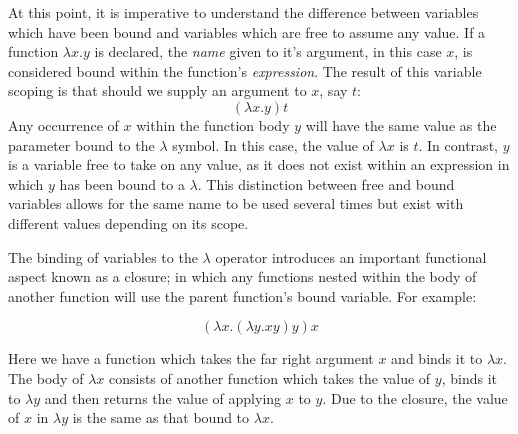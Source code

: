 \documentclass[12pt,a4paper]{article}
\begin{document}
At this point, it is imperative to understand the difference between variables which have been bound and variables which are free to assume any value. If a function $\lambda x.y$ is declared, the \emph{name} given to it's argument, in this case $x$, is considered bound within the function's \emph{expression}. The result of this variable scoping is that should we supply an argument to $x$, say $t$:
\begin{displaymath}
    (\lambda x.y)t
\end{displaymath}
Any occurrence of $x$ within the function body $y$ will have the same value as the parameter bound to the $\lambda$ symbol. In this case, the value of $\lambda x$ is $t$. In contrast, $y$ is a variable free to take on any value, as it does not exist within an expression in which $y$ has been bound to a $\lambda$. This distinction between free and bound variables allows for the same name to be used several times but exist with different values depending on its scope.

The binding of variables to the $\lambda$ operator introduces an important functional aspect known as a closure; in which any functions nested within the body of another function will use the parent function's bound variable. For example:

\begin{displaymath}
    ( \lambda x.(\lambda y.xy)y)x
\end{displaymath}

Here we have a function which takes the far right argument $x$ and binds it to $\lambda x$. The body of $\lambda x$ consists of another function which takes the value of $y$, binds it to $\lambda y$ and then returns the value of applying $x$ to $y$. Due to the closure, the value of $x$ in $\lambda y$ is the same as that bound to $\lambda x$.
\end{document}
